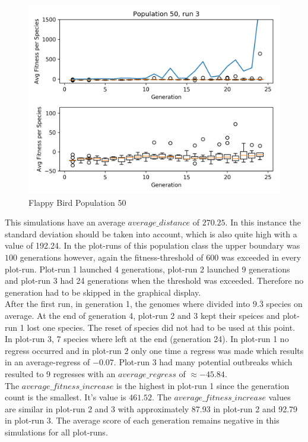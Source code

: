 \begin{figure}[h]
				\begin{minipage}{0.33\textwidth}
					\centering
					\includegraphics[width=1\textwidth]{graphics/flappy/pop50_run3} %
				\end{minipage}
				\caption{Flappy Bird Population 50}
				\label{fig:flappy50}
			\end{figure}
			This simulations have an average $average\_distance$ of $270.25$. In this instance the standard deviation should be taken into account, which is also quite high with a value of 192.24. 
			In the plot-runs of this population class the upper boundary was $100$ generations however, again the fitness-threshold of 600 was exceeded in every plot-run. Plot-run 1 launched 4 generations, plot-run 2 launched 9 generations and plot-run 3 had 24 generations when the threshold was exceeded. Therefore no generation had to be skipped in the graphical display.\\
			After the first run, in generation 1, the genomes where divided into $9.\overline{3}$ species on average. At the end of generation 4, plot-run 2 and 3 kept their speices and plot-run 1 lost one species. The reset of species did not had to be used at this point. In plot-run 3, 7 species where left at the end (generation 24).
			In plot-run 1 no regress occurred and in plot-run 2 only one time a regress was made which results in an average-regress of $-0.07$. Plot-run 3 had many potential outbreaks which resulted to 9 regresses with an $average\_regress$ of $\approx-45.84$.\\
			The $average\_fitness\_increase$ is the highest in plot-run 1 since the generation count is the smallest. It's value is $461.52$. The $average\_fitness\_increase$ values are similar in plot-run 2 and 3 with approximately 87.93 in plot-run 2 and 92.79 in plot-run 3. The average score of each generation remains negative in this simulations for all plot-runs.
		
